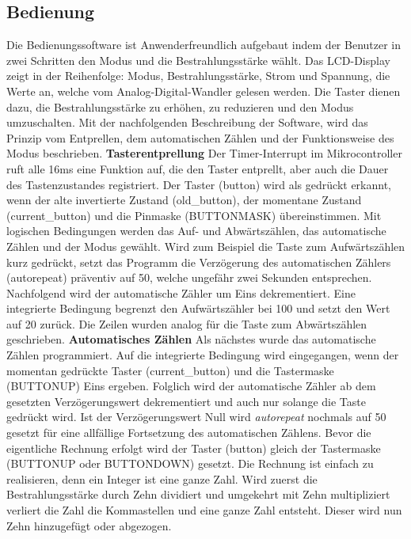 \subsection{Bedienung}
Die Bedienungssoftware ist Anwenderfreundlich aufgebaut indem der Benutzer in zwei Schritten den Modus und die Bestrahlungsstärke wählt.
\newline
Das LCD-Display zeigt in der Reihenfolge: Modus, Bestrahlungsstärke, Strom und Spannung, die Werte an, welche vom Analog-Digital-Wandler gelesen werden. Die Taster dienen dazu, die Bestrahlungsstärke zu erhöhen, zu reduzieren und den Modus umzuschalten. Mit der nachfolgenden Beschreibung der Software, wird das Prinzip vom Entprellen, dem automatischen Zählen und der Funktionsweise des Modus beschrieben.
\newline
\textbf{Tasterentprellung}
\newline
Der Timer-Interrupt im Mikrocontroller ruft alle 16ms eine Funktion auf, die den Taster entprellt, aber auch die Dauer des Tastenzustandes registriert.
Der Taster (button) wird als gedrückt erkannt, wenn der alte invertierte Zustand (old\_button), der momentane Zustand (current\_button) und die Pinmaske (BUTTONMASK) übereinstimmen.
Mit logischen Bedingungen werden das Auf- und Abwärtszählen, das automatische Zählen und der Modus gewählt. Wird zum Beispiel die Taste zum Aufwärtszählen kurz gedrückt, setzt das Programm die Verzögerung des automatischen Zählers (autorepeat) präventiv auf 50, welche ungefähr zwei Sekunden entsprechen. Nachfolgend wird der automatische Zähler um Eins dekrementiert. Eine integrierte Bedingung begrenzt den Aufwärtszähler bei 100 und setzt den Wert auf 20 zurück.
\newline
Die Zeilen wurden analog für die Taste zum Abwärtszählen geschrieben.
\newline
\textbf{Automatisches Zählen}
\newline
Als nächstes wurde das automatische Zählen programmiert. Auf die integrierte Bedingung wird eingegangen, wenn der momentan gedrückte Taster (current\_button) und die Tastermaske (BUTTONUP) Eins ergeben. Folglich wird der automatische Zähler ab dem gesetzten Verzögerungswert dekrementiert und auch nur solange die Taste gedrückt wird. Ist der Verzögerungswert Null wird \textit{autorepeat} nochmals auf 50 gesetzt für eine allfällige Fortsetzung des automatischen Zählens. Bevor die eigentliche Rechnung erfolgt wird der Taster (button) gleich der Tastermaske (BUTTONUP oder BUTTONDOWN) gesetzt. Die Rechnung ist einfach zu realisieren, denn ein Integer ist eine ganze Zahl. Wird zuerst die Bestrahlungsstärke durch Zehn dividiert und umgekehrt mit Zehn multipliziert verliert die Zahl die Kommastellen und eine ganze Zahl entsteht. Dieser wird nun Zehn hinzugefügt oder abgezogen.
